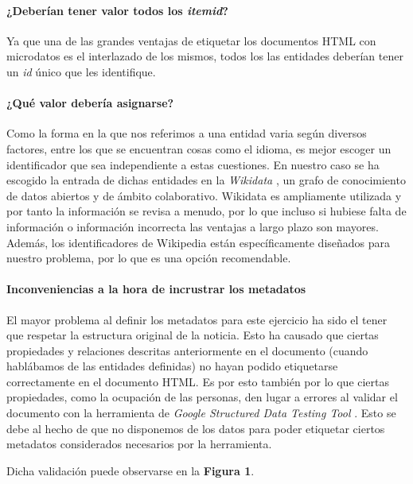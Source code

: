 \documentclass[11pt]{article}
\begin{document}
\paragraph{¿Deberían tener valor todos los \textit{itemid}?}
Ya que una de las grandes ventajas de etiquetar los documentos HTML con microdatos es el interlazado de los mismos, todos los las entidades deberían tener un \textit{id} único que les identifique.

\paragraph{¿Qué valor debería asignarse?}
Como la forma en la que nos referimos a una entidad varia según diversos factores, entre los que se encuentran cosas como el idioma, es mejor escoger un identificador que sea independiente a estas cuestiones. En nuestro caso se ha escogido la entrada de dichas entidades en la \textit{Wikidata} \cite{wikidata}, un grafo de conocimiento de datos abiertos y de ámbito colaborativo. Wikidata es ampliamente utilizada y por tanto la información se revisa a menudo, por lo que incluso si hubiese falta de información o información incorrecta las ventajas a largo plazo son mayores. Además, los identificadores de Wikipedia están específicamente diseñados para nuestro problema, por lo que es una opción recomendable.

\paragraph{Inconveniencias a la hora de incrustrar los metadatos}
El mayor problema al definir los metadatos para este ejercicio ha sido el tener que respetar la estructura original de la noticia. Esto ha causado que ciertas propiedades y relaciones descritas anteriormente en el documento (cuando hablábamos de las entidades definidas) no hayan podido etiquetarse correctamente en el documento HTML. Es por esto también por lo que ciertas propiedades, como la ocupación de las personas, den lugar a errores al validar el documento con la herramienta de \textit{Google Structured Data Testing Tool} \cite{googlesdtt}. Esto se debe al hecho de que no disponemos de los datos para poder etiquetar ciertos metadatos considerados necesarios por la herramienta.

Dicha validación puede observarse en la \textbf{Figura 1}.
\end{document}
